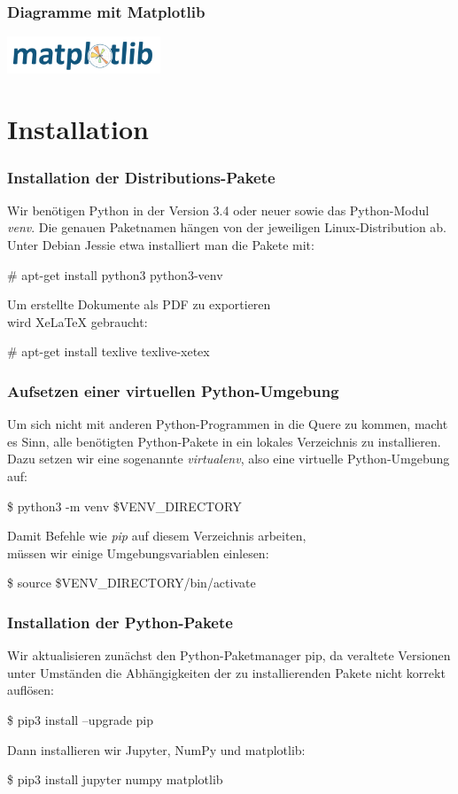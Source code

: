 \documentclass{beamer}
\begin{document}
\begin{frame}
  \frametitle{Diagramme mit Matplotlib}
  \includegraphics[width=1.8in]{matplotlib-logo.png}
\end{frame}

\section{Installation}

\begin{frame}
  \frametitle{Installation der Distributions-Pakete}
  Wir ben\"otigen Python in der Version 3.4 oder neuer sowie das Python-Modul \emph{venv}.
  Die genauen Paketnamen h\"angen von der jeweiligen Linux-Distribution ab.
  Unter Debian Jessie etwa installiert man die Pakete mit:
  \begin{semiverbatim}
    \# apt-get install python3 python3-venv
  \end{semiverbatim}
  Um erstellte Dokumente als PDF zu exportieren \\ wird XeLaTeX gebraucht:
  \begin{semiverbatim}
    \# apt-get install texlive texlive-xetex
  \end{semiverbatim}
\end{frame}

\begin{frame}
  \frametitle{Aufsetzen einer virtuellen Python-Umgebung}
  Um sich nicht mit anderen Python-Programmen in die Quere zu kommen,
  macht es Sinn, alle ben\"otigten Python-Pakete in ein lokales Verzeichnis
  zu installieren.
  Dazu setzen wir eine sogenannte \emph{virtualenv}, also eine virtuelle
  Python-Umgebung auf:
  \begin{semiverbatim}
    \$ python3 -m venv \$VENV\_DIRECTORY
  \end{semiverbatim}
  Damit Befehle wie \emph{pip} auf diesem Verzeichnis arbeiten, \\
  m\"ussen wir einige Umgebungsvariablen einlesen:
  \begin{semiverbatim}
    \$ source \$VENV\_DIRECTORY/bin/activate
  \end{semiverbatim}
\end{frame}

\begin{frame}
  \frametitle{Installation der Python-Pakete}
  Wir aktualisieren zun\"achst den Python-Paketmanager pip,
  da veraltete Versionen unter Umst\"anden die Abh\"angigkeiten
  der zu installierenden Pakete nicht korrekt aufl\"osen:
  \begin{semiverbatim}
    \$ pip3 install --upgrade pip
  \end{semiverbatim}
  Dann installieren wir Jupyter, NumPy und matplotlib:
  \begin{semiverbatim}
    \$ pip3 install jupyter numpy matplotlib
  \end{semiverbatim}
\end{frame}
\end{document}
